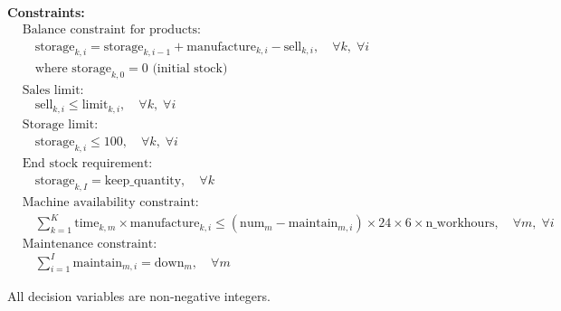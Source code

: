 \documentclass{article}
\begin{document}
\textbf{Constraints:}
\begin{align*}
    & \text{Balance constraint for products:} \\
    & \quad \text{storage}_{k,i} = \text{storage}_{k,i-1} + \text{manufacture}_{k,i} - \text{sell}_{k,i}, \quad \forall k, \; \forall i \\
    & \quad \text{where } \text{storage}_{k,0} = 0 \text{ (initial stock)} \\
    & \text{Sales limit:} \\
    & \quad \text{sell}_{k,i} \leq \text{limit}_{k,i}, \quad \forall k, \; \forall i \\
    & \text{Storage limit:} \\
    & \quad \text{storage}_{k,i} \leq 100, \quad \forall k, \; \forall i \\
    & \text{End stock requirement:} \\
    & \quad \text{storage}_{k,I} = \text{keep\_quantity}, \quad \forall k \\
    & \text{Machine availability constraint:} \\
    & \quad \sum_{k=1}^{K} \text{time}_{k,m} \times \text{manufacture}_{k,i} \leq \left(\text{num}_m - \text{maintain}_{m,i}\right) \times 24 \times 6 \times \text{n\_workhours}, \quad \forall m, \; \forall i \\
    & \text{Maintenance constraint:} \\
    & \quad \sum_{i=1}^{I} \text{maintain}_{m,i} = \text{down}_m, \quad \forall m
\end{align*}

All decision variables are non-negative integers.
\end{document}
